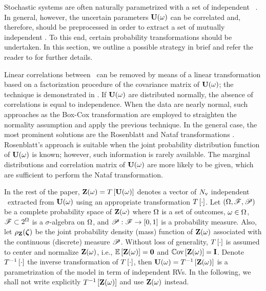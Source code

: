 Stochastic systems are often naturally parametrized with a set of independent \rvs\ \cite{xiu2010}. In general, however, the uncertain parameters $\mathbf{U}(\omega)$ can be correlated and, therefore, should be preprocessed in order to extract a set of mutually independent \rvs. To this end, certain probability transformations should be undertaken. In this section, we outline a possible strategy in brief and refer the reader to \cite{xiu2010, eldred2009} for further details.

Linear correlations between \rvs\ can be removed by means of a linear transformation based on a factorization procedure of the covariance matrix of $\mathbf{U}(\omega)$; the technique is demonstrated in . If $\mathbf{U}(\omega)$ are distributed normally, the absence of correlations is equal to independence. When the data are nearly normal, such approaches as the Box-Cox transformation are employed to straighten the normality assumption and apply the previous technique. In the general case, the most prominent solutions are the Rosenblatt and Nataf transformations \cite{eldred2009}. Rosenblatt's approach is suitable when the joint probability distribution function of $\mathbf{U}(\omega)$ is known; however, such information is rarely available. The marginal distributions and correlation matrix of $\mathbf{U}(\omega)$ are more likely to be given, which are sufficient to perform the Nataf transformation.

In the rest of the paper, $\mathbf{Z}(\omega) = T\left[\mathbf{U}(\omega)\right]$ denotes a vector of ${N_\text{v}}$ independent \rvs\ extracted from $\mathbf{U}(\omega)$ using an appropriate transformation $T\left[\cdot\right]$. Let $(\Omega, \mathscr{F}, \mathscr{P})$ be a complete probability space \cite{durrett2010} of $\mathbf{Z}(\omega)$ where $\Omega$ is a set of outcomes, $\omega \in \Omega$, $\mathscr{F} \subset 2^\Omega$ is a $\sigma$-algebra on $\Omega$, and $\mathscr{P}: \mathscr{F} \to [0, 1]$ is a probability measure. Also, let $\rho_{\mathbf{Z}}(\boldsymbol{\zeta})$ be the joint probability density (mass) function of $\mathbf{Z}(\omega)$ associated with the continuous (discrete) measure $\mathscr{P}$. Without loss of generality, $T\left[\cdot\right]$ is assumed to center and normalize $\mathbf{Z}(\omega)$, i.e., $\oExp{\vZ(\o)} = \mZero$ and $\oCov{\vZ(\o)} = \mI$. Denote $T^{-1}\left[\cdot\right]$ the inverse transformation of $T\left[\cdot\right]$, then $\mathbf{U}(\omega) = T^{-1}\left[\mathbf{Z}(\omega)\right]$ is a parametrization of the model in term of independent RVs. In the following, we shall not write explicitly $T^{-1}\left[\mathbf{Z}(\omega)\right]$ and use $\mathbf{Z}(\omega)$ instead.
